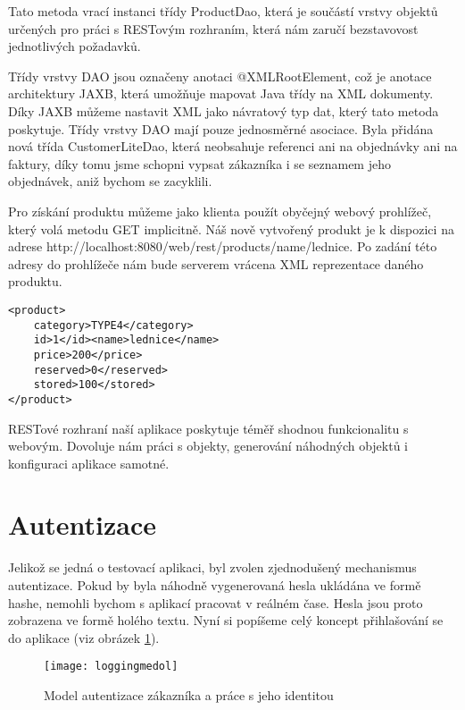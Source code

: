 \documentclass[122pt,oneside]{fithesis}
\begin{document}
Tato metoda vrací instanci třídy ProductDao, která je součástí vrstvy objektů určených pro práci s RESTovým rozhraním, která nám zaručí bezstavovost jednotlivých požadavků. 

Třídy vrstvy DAO jsou označeny anotaci @XMLRootElement, což je anotace architektury JAXB, která umožňuje mapovat Java třídy na XML dokumenty. Díky JAXB můžeme nastavit XML jako návratový typ dat, který tato metoda poskytuje. Třídy vrstvy DAO mají pouze jednosměrné asociace. Byla přidána nová třída CustomerLiteDao, která neobsahuje referenci ani na objednávky ani na faktury, díky tomu jsme schopni vypsat zákazníka i se seznamem jeho objednávek, aniž bychom se zacyklili.

Pro získání produktu můžeme jako klienta použít obyčejný webový prohlížeč, který volá metodu GET implicitně. Náš nově vytvořený produkt je k dispozici na adrese http://localhost:8080/web/rest/products/name/lednice.
Po zadání této adresy do prohlížeče nám bude serverem vrácena XML reprezentace daného produktu.

\begin{lstlisting}
<product>
	category>TYPE4</category>
	id>1</id><name>lednice</name>
	price>200</price>
	reserved>0</reserved>
	stored>100</stored>
</product>
\end{lstlisting}

RESTové rozhraní naší aplikace poskytuje téměř shodnou funkcionalitu s webovým. Dovoluje nám práci s objekty, generování náhodných objektů i konfiguraci aplikace samotné.

\section{Autentizace}
Jelikož se jedná o testovací aplikaci, byl zvolen zjednodušený mechanismus autentizace. Pokud by byla náhodně vygenerovaná hesla ukládána ve formě hashe, nemohli bychom s aplikací pracovat v reálném čase. Hesla jsou proto zobrazena ve formě holého textu. Nyní si popíšeme celý koncept přihlašování se do aplikace (viz obrázek \ref{img:identity}).

\begin{figure}[!ht]
\centering
\texttt{[image: loggingmedol]}
\caption{Model autentizace zákazníka a práce s jeho identitou}
\label{img:identity}
\end{figure}
\end{document}
